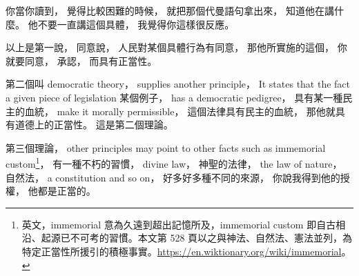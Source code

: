 \hypertarget{w02:cue:1125}{}你當你讀到，
\hypertarget{w02:cue:1126}{}覺得比較困難的時候，
\hypertarget{w02:cue:1127}{}就把那個代曼語句拿出來，
\hypertarget{w02:cue:1128}{}知道他在講什麼。
\hypertarget{w02:cue:1129}{}他不要一直講這個具體，
\hypertarget{w02:cue:1130}{}我覺得你這樣很反應。

\hypertarget{w02:cue:1131}{}以上是第一說，
\hypertarget{w02:cue:1132}{}同意說，
\hypertarget{w02:cue:1133}{}人民對某個具體行為有同意，
\hypertarget{w02:cue:1134}{}那他所實施的這個，
\hypertarget{w02:cue:1135}{}你就要同意，
\hypertarget{w02:cue:1136}{}承認，
\hypertarget{w02:cue:1137}{}而具有正當性。

\hypertarget{w02:cue:1138}{}第二個叫 democratic theory，
\hypertarget{w02:cue:1139}{}supplies another principle，
\hypertarget{w02:cue:1140}{}It states that the fact
\hypertarget{w02:cue:1141}{}a given piece of legislation
\hypertarget{w02:cue:1142}{}某個例子，
\hypertarget{w02:cue:1143}{}has a democratic pedigree，
\hypertarget{w02:cue:1144}{}具有某一種民主的血統，
\hypertarget{w02:cue:1145}{}make it morally permissible，
\hypertarget{w02:cue:1146}{}這個法律具有民主的血統，
\hypertarget{w02:cue:1147}{}那他就具有道德上的正當性。
\hypertarget{w02:cue:1148}{}這是第二個理論。

\hypertarget{w02:cue:1149}{}第三個理論，
\hypertarget{w02:cue:1150}{}other principles may point to other facts
\hypertarget{w02:cue:1151}{}such as immemorial custom\footnote{英文，immemorial 意為久遠到超出記憶所及，immemorial custom 即自古相沿、起源已不可考的習慣。本文第 528 頁以之與神法、自然法、憲法並列，為特定正當性所援引的積極事實。\url{https://en.wiktionary.org/wiki/immemorial}。}，
\hypertarget{w02:cue:1152}{}有一種不朽的習慣，
\hypertarget{w02:cue:1153}{}divine law，
\hypertarget{w02:cue:1154}{}神聖的法律，
\hypertarget{w02:cue:1155}{}the law of nature，
\hypertarget{w02:cue:1156}{}自然法，
\hypertarget{w02:cue:1157}{}a constitution and so on，
\hypertarget{w02:cue:1158}{}好多好多種不同的來源，
\hypertarget{w02:cue:1159}{}你說我得到他的授權，
\hypertarget{w02:cue:1160}{}他都是正當的。

